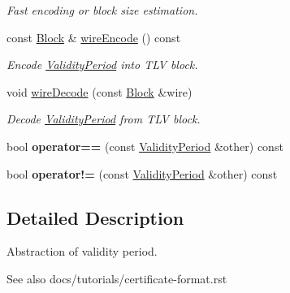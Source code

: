 \begin{DoxyCompactItemize}
\begin{DoxyCompactList}\small\item\em Fast encoding or block size estimation. \end{DoxyCompactList}\item 
const \hyperlink{classndn_1_1Block}{Block} \& \hyperlink{classndn_1_1security_1_1ValidityPeriod_af2d8196ebabd276b9899ace2e8c26cf9}{wire\+Encode} () const\hypertarget{classndn_1_1security_1_1ValidityPeriod_af2d8196ebabd276b9899ace2e8c26cf9}{}\label{classndn_1_1security_1_1ValidityPeriod_af2d8196ebabd276b9899ace2e8c26cf9}

\begin{DoxyCompactList}\small\item\em Encode \hyperlink{classndn_1_1security_1_1ValidityPeriod}{Validity\+Period} into T\+LV block. \end{DoxyCompactList}\item 
void \hyperlink{classndn_1_1security_1_1ValidityPeriod_a78069c3360c5270d9a157e30f54b2c0b}{wire\+Decode} (const \hyperlink{classndn_1_1Block}{Block} \&wire)
\begin{DoxyCompactList}\small\item\em Decode \hyperlink{classndn_1_1security_1_1ValidityPeriod}{Validity\+Period} from T\+LV block. \end{DoxyCompactList}\item 
bool {\bfseries operator==} (const \hyperlink{classndn_1_1security_1_1ValidityPeriod}{Validity\+Period} \&other) const\hypertarget{classndn_1_1security_1_1ValidityPeriod_a7fd380753f79f9b96b6a996b6f386b64}{}\label{classndn_1_1security_1_1ValidityPeriod_a7fd380753f79f9b96b6a996b6f386b64}

\item 
bool {\bfseries operator!=} (const \hyperlink{classndn_1_1security_1_1ValidityPeriod}{Validity\+Period} \&other) const\hypertarget{classndn_1_1security_1_1ValidityPeriod_aa6486ae7cddebad629ed96ae5f77860a}{}\label{classndn_1_1security_1_1ValidityPeriod_aa6486ae7cddebad629ed96ae5f77860a}

\end{DoxyCompactItemize}


\subsection{Detailed Description}
Abstraction of validity period. 

\begin{DoxySeeAlso}{See also}
docs/tutorials/certificate-\/format.\+rst 
\end{DoxySeeAlso}


